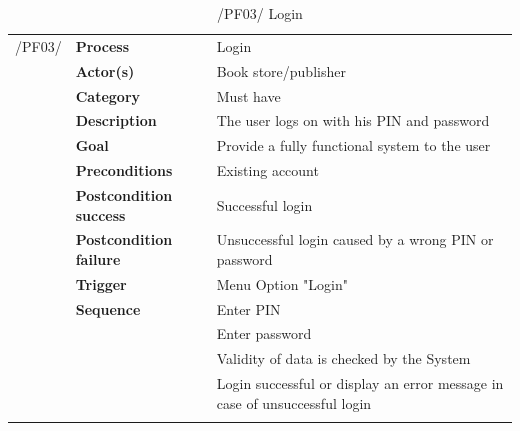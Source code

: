 \documentclass[11pt,a4paper,oneside,svgnames]{report}
\begin{document}
\begin{table}[H]
\centering
\begin{tabular}{p{1.5cm}p{3cm}p{8cm}}
\cellcolor{white}/PF03/	& \textbf{Process} & Login\\
\cellcolor{white}		& \textbf{Actor(s)} & Book store/publisher\\
\cellcolor{white}		& \textbf{Category} & Must have\\
\cellcolor{white}		& \textbf{Description}	 & The user logs on with his PIN and password\\
\cellcolor{white}		& \textbf{Goal} & Provide a fully functional system to the user\\
\cellcolor{white}		& \textbf{Preconditions} & Existing account\\
\cellcolor{white}		& \textbf{Postcondition success} & Successful login\\
\cellcolor{white}		& \textbf{Postcondition failure} & Unsuccessful login caused by a wrong PIN or password\\
\cellcolor{white}		& \textbf{Trigger} & Menu Option "Login"\\
\cellcolor{white}		& \textbf{Sequence} & Enter PIN\\
\cellcolor{white}		& & Enter password\\
\cellcolor{white}		& & Validity of data is checked by the System\\
\cellcolor{white}		& & Login successful or display an error message in case of unsuccessful login\\
\cellcolor{white}\hfill \\
\end{tabular}
\caption{/PF03/ Login}
\label{tab:pf03}
\end{table}
\end{document}
